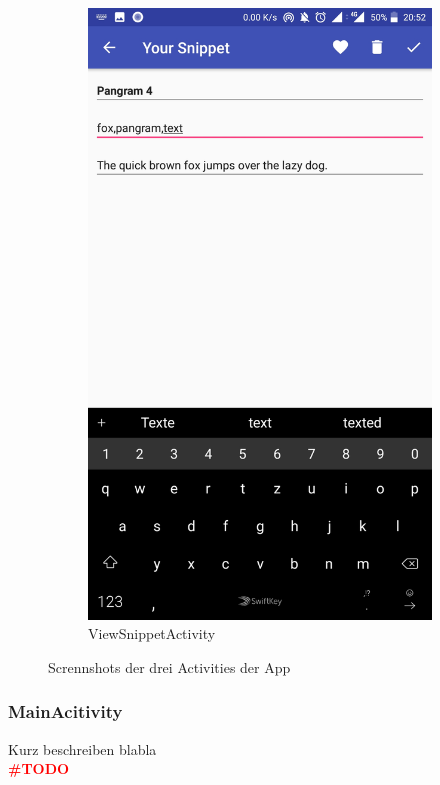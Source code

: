 \documentclass[11pt]{article}
\begin{document}
\begin{figure}
				\begin{subfigure}[b]{0.3\textwidth}
					\includegraphics[width=\textwidth]{Konzepte/screenshots/edit_snippet.jpg}
					\caption{ViewSnippetActivity}
				\end{subfigure}
				\caption{Scrennshots der drei Activities der App}
				\label{fig:activities}
			\end{figure}
		
			\subsubsection{MainAcitivity}
				Kurz beschreiben blabla \\
				\textcolor{red}{\textbf{{\LARGE \#TODO}}}
				
\end{document}
